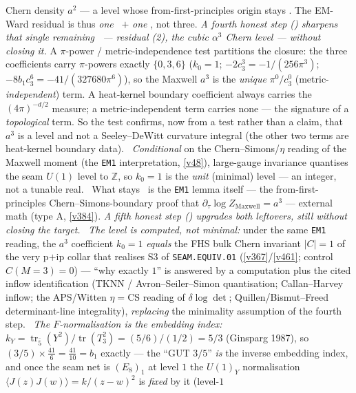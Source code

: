 \documentclass[11pt,a4paper]{article}
\newcommand{\cthree}{c_3}
\newcommand{\Z}{\mathbb{Z}}
\theoremstyle{definition}
\begin{document}
Chern density $a^2$ --- a level whose from-first-principles origin stays \mO. The EM-Ward residual is thus
\emph{one} \mC\ $+$ \emph{one} \mO, not three.
\emph{A fourth honest step () sharpens that single remaining \mO\
--- residual (2), the cubic $\alpha^3$ Chern level --- without closing it.} A $\pi$-power / metric-independence
test partitions the closure: the three coefficients carry $\pi$-powers exactly $\{0,3,6\}$ ($k_0=1$;
$-2\cthree^3=-1/(256\pi^3)$; $-8b_1\cthree^6=-41/(327680\pi^6)$), so the Maxwell $a^3$ is the \emph{unique}
$\pi^0/\cthree^0$ (metric-\emph{independent}) term. A heat-kernel boundary coefficient always carries the
$(4\pi)^{-d/2}$ measure; a metric-independent term carries none --- the signature of a \emph{topological}
term. So the test confirms, now from a test rather than a claim, that $a^3$ is a level and not a
Seeley--DeWitt curvature integral (the other two terms are heat-kernel boundary data). \mE\ \emph{Conditional}
on the Chern--Simons/$\eta$ reading of the Maxwell moment (the \texttt{EM1} interpretation, \vref{v48}),
large-gauge invariance quantises the seam $U(1)$ level to $\Z$, so $k_0=1$ is the \emph{unit} (minimal) level
--- an integer, not a tunable real. \mC\ What stays \mO\ is the \texttt{EM1} lemma itself --- the
from-first-principles Chern--Simons-boundary proof that $\partial_\tau\log Z_{\mathrm{Maxwell}}=a^3$ ---
external math (type A, \vref{v384}).
\emph{A fifth honest step () upgrades both leftovers, still without
closing the target.} \mC\ \emph{The level is computed, not minimal:} under the same \texttt{EM1} reading, the
$a^3$ coefficient $k_0=1$ \emph{equals} the FHS bulk Chern invariant $|C|=1$ of the very p$+$ip collar that
realises S3 of \texttt{SEAM.EQUIV.01} (\vref{v367}/\vref{v461}; control $C(M{=}3)=0$) --- ``why exactly
$1$'' is answered by a computation plus the cited inflow identification (TKNN / Avron--Seiler--Simon
quantisation; Callan--Harvey inflow; the APS/Witten $\eta{=}$CS reading of $\delta\log\det$;
Quillen/Bismut--Freed determinant-line integrality), \emph{replacing} the minimality assumption of the fourth
step. \mE\ \emph{The $F$-normalisation is the embedding index:} $k_Y=\operatorname{tr}_{\bar 5}(Y^2)/
\operatorname{tr}(T_3^2)=(5/6)/(1/2)=5/3$ (Ginsparg 1987), so $(3/5)\times\tfrac{41}{6}=\tfrac{41}{10}=b_1$
exactly --- the ``GUT $3/5$'' \emph{is} the inverse embedding index, and once the seam net is $(E_8)_1$ at
level $1$ the $U(1)_Y$ normalisation $\langle J(z)J(w)\rangle=k/(z{-}w)^2$ is \emph{fixed} by it (level-$1$
\end{document}
